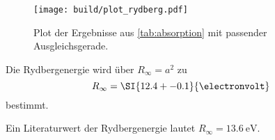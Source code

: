 \begin{figure}
    \centering
    \texttt{[image: build/plot\_rydberg.pdf]}
    \caption{Plot der Ergebnisse aus \autoref{tab:absorption} mit passender Ausgleichsgerade.}
    \label{fig:plot_rydberg}
\end{figure}

Die Rydbergenergie wird über $R_\infty=a^2$ zu 
\begin{equation*}
    R_\infty = \SI{12.4+-0.1}{\electronvolt}
\end{equation*}
bestimmt.

Ein Literaturwert der Rydbergenergie lautet $R_\infty=\SI{13.6}{\electronvolt}$.\cite{V602}